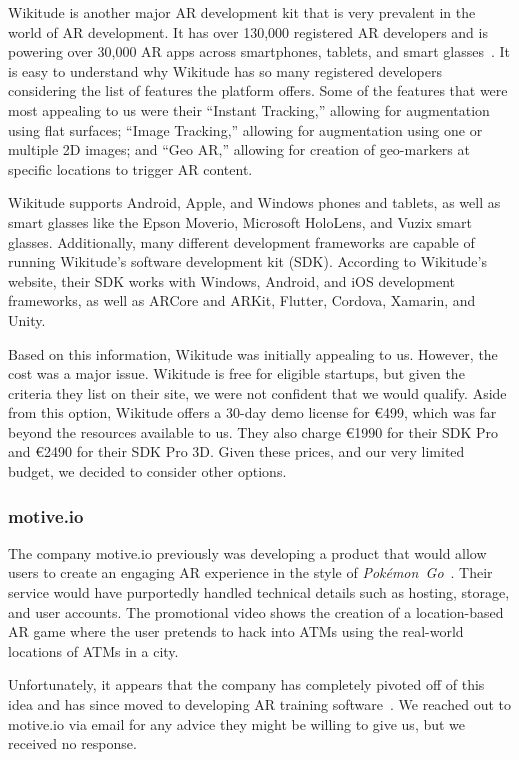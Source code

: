 \documentclass[a4paper, 10pt, american, titlepage]{article}
\begin{document}
Wikitude is another major AR development kit that is very prevalent in the world
of AR development. It has over 130,000 registered AR developers and is powering
over 30,000 AR apps across smartphones, tablets, and smart
glasses~\autocite{wikitude2018}. It is easy to understand why Wikitude has so
many registered developers considering the list of features the platform offers.
Some of the features that were most appealing to us were their ``Instant
Tracking,'' allowing for augmentation using flat surfaces; ``Image Tracking,''
allowing for augmentation using one or multiple 2D images; and ``Geo AR,''
allowing for creation of geo-markers at specific locations to trigger AR
content.

Wikitude supports Android, Apple, and Windows phones and tablets, as well as
smart glasses like the Epson Moverio, Microsoft HoloLens, and Vuzix smart
glasses. Additionally, many different development frameworks are capable of
running Wikitude's software development kit (SDK). According to Wikitude's
website, their SDK works with Windows, Android, and iOS development frameworks,
as well as ARCore and ARKit, Flutter, Cordova, Xamarin, and Unity.

Based on this information, Wikitude was initially appealing to us. However, the
cost was a major issue. Wikitude is free for eligible startups, but given the
criteria they list on their site, we were not confident that we would qualify.
Aside from this option, Wikitude offers a 30-day demo license for \euro{499},
which was far beyond the resources available to us. They also charge
\euro{1990} for their SDK Pro and \euro{2490} for their SDK Pro 3D. Given
these prices, and our very limited budget, we decided to consider other
options.

\subsubsection{motive.io}
\label{sec:motive.io}

The company motive.io previously was developing a product that would allow
users to create an engaging AR experience in the style of
\textit{Pokémon~Go}~\autocite{odom2017}. Their service would have purportedly
handled technical details such as hosting, storage, and user accounts. The
promotional video shows the creation of a location-based AR game where the user
pretends to hack into ATMs using the real-world locations of ATMs in a city.

Unfortunately, it appears that the company has completely pivoted off of this
idea and has since moved to developing AR training software~\autocite{motiveio}.
We reached out to motive.io via email for any advice they might be willing to
give us, but we received no response.
\end{document}
